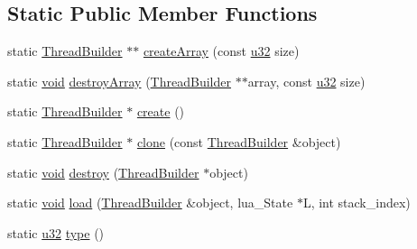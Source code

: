 \subsection*{Static Public Member Functions}
\begin{DoxyCompactItemize}
\item 
static \mbox{\hyperlink{classnjli_1_1_thread_builder}{Thread\+Builder}} $\ast$$\ast$ \mbox{\hyperlink{classnjli_1_1_thread_builder_a602cd7eca7d3c71df536c32e430cadaf}{create\+Array}} (const \mbox{\hyperlink{_util_8h_a10e94b422ef0c20dcdec20d31a1f5049}{u32}} size)
\item 
static \mbox{\hyperlink{_thread_8h_af1e856da2e658414cb2456cb6f7ebc66}{void}} \mbox{\hyperlink{classnjli_1_1_thread_builder_a3206de9874c908cc6c0700781f04d5d0}{destroy\+Array}} (\mbox{\hyperlink{classnjli_1_1_thread_builder}{Thread\+Builder}} $\ast$$\ast$array, const \mbox{\hyperlink{_util_8h_a10e94b422ef0c20dcdec20d31a1f5049}{u32}} size)
\item 
static \mbox{\hyperlink{classnjli_1_1_thread_builder}{Thread\+Builder}} $\ast$ \mbox{\hyperlink{classnjli_1_1_thread_builder_af9d34834b3e1c597062aa8ba3cc9202a}{create}} ()
\item 
static \mbox{\hyperlink{classnjli_1_1_thread_builder}{Thread\+Builder}} $\ast$ \mbox{\hyperlink{classnjli_1_1_thread_builder_a6accf6a772f344091930e2004ea4038d}{clone}} (const \mbox{\hyperlink{classnjli_1_1_thread_builder}{Thread\+Builder}} \&object)
\item 
static \mbox{\hyperlink{_thread_8h_af1e856da2e658414cb2456cb6f7ebc66}{void}} \mbox{\hyperlink{classnjli_1_1_thread_builder_a7165d5e0c4523d1174d7d660d8701081}{destroy}} (\mbox{\hyperlink{classnjli_1_1_thread_builder}{Thread\+Builder}} $\ast$object)
\item 
static \mbox{\hyperlink{_thread_8h_af1e856da2e658414cb2456cb6f7ebc66}{void}} \mbox{\hyperlink{classnjli_1_1_thread_builder_a9812137b110eb6b877466ee36ce134bd}{load}} (\mbox{\hyperlink{classnjli_1_1_thread_builder}{Thread\+Builder}} \&object, lua\+\_\+\+State $\ast$L, int stack\+\_\+index)
\item 
static \mbox{\hyperlink{_util_8h_a10e94b422ef0c20dcdec20d31a1f5049}{u32}} \mbox{\hyperlink{classnjli_1_1_thread_builder_a648198257fe14369e1868a420e1bab47}{type}} ()
\end{DoxyCompactItemize}
